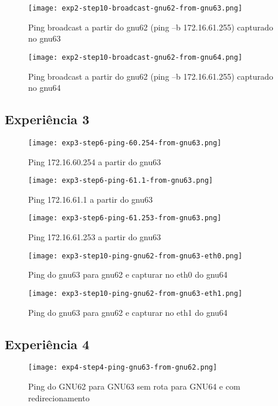 \documentclass[article, a4paper, 11pt, oneside]{memoir}
\begin{document}
\begin{figure}[h]
	\centering
\texttt{[image: exp2-step10-broadcast-gnu62-from-gnu63.png]}
\caption{Ping broadcast a partir do gnu62 (ping –b 172.16.61.255) capturado no gnu63}
\end{figure}

\begin{figure}[h]
	\centering
\texttt{[image: exp2-step10-broadcast-gnu62-from-gnu64.png]}
\caption{Ping broadcast a partir do gnu62 (ping –b 172.16.61.255) capturado no gnu64}
\end{figure}

\newpage
\subsection{Experiência 3}
\begin{figure}[h]
	\centering
\texttt{[image: exp3-step6-ping-60.254-from-gnu63.png]}
\caption{Ping 172.16.60.254 a partir do gnu63}
\end{figure}

\begin{figure}[h]
	\centering
\texttt{[image: exp3-step6-ping-61.1-from-gnu63.png]}
\caption{Ping 172.16.61.1 a partir do gnu63}
\end{figure}

\begin{figure}[h]
	\centering
\texttt{[image: exp3-step6-ping-61.253-from-gnu63.png]}
\caption{Ping 172.16.61.253 a partir do gnu63}
\end{figure}

\newpage
\begin{figure}[h]
	\centering
\texttt{[image: exp3-step10-ping-gnu62-from-gnu63-eth0.png]}
\caption{Ping do gnu63 para gnu62 e capturar no eth0 do gnu64}
\end{figure}

\begin{figure}[h]
	\centering
\texttt{[image: exp3-step10-ping-gnu62-from-gnu63-eth1.png]}
\caption{Ping do gnu63 para gnu62 e capturar no eth1 do gnu64}
\end{figure}

\newpage
\subsection{Experiência 4}
\begin{figure}[h]
	\centering
\texttt{[image: exp4-step4-ping-gnu63-from-gnu62.png]}
\caption{Ping do GNU62 para GNU63 sem rota para GNU64 e com redirecionamento}
\end{figure}
\end{document}
